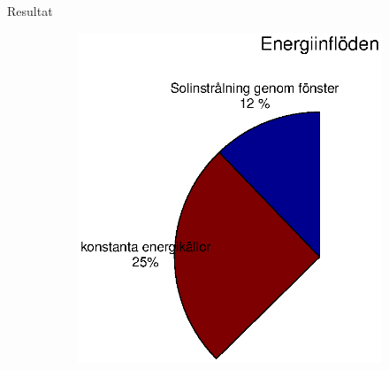 \begin{frame}{Resultat}
\begin{figure}
\begin{subfigure}[b]{0.5\textwidth}
                \includegraphics[width=\textwidth]{images/totalflow_out.eps}
        \end{subfigure}
\end{figure}

\end{frame}
